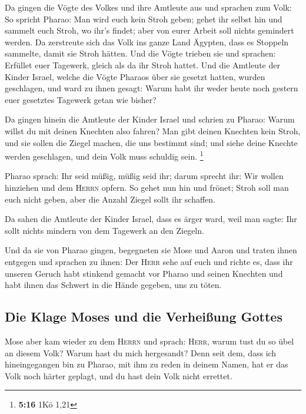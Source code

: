  Da gingen die Vögte des Volkes und ihre Amtleute aus und
sprachen zum Volk: So spricht Pharao: Man wird euch kein Stroh geben;
 gehet ihr selbst hin und sammelt euch Stroh, wo ihr's
findet; aber von eurer Arbeit soll nichts gemindert werden.
 Da zerstreute sich das Volk ins ganze Land Ägypten, dass
es Stoppeln sammelte, damit sie Stroh hätten.  Und die
Vögte trieben sie und sprachen: Erfüllet euer Tagewerk, gleich als da
ihr Stroh hattet.  Und die Amtleute der Kinder Israel,
welche die Vögte Pharaos über sie gesetzt hatten, wurden geschlagen, und
ward zu ihnen gesagt: Warum habt ihr weder heute noch gestern euer
gesetztes Tagewerk getan wie bisher?

 Da gingen hinein die Amtleute der Kinder Israel und
schrien zu Pharao: Warum willst du mit deinen Knechten also fahren?
 Man gibt deinen Knechten kein Stroh, und sie sollen die
Ziegel machen, die uns bestimmt sind; und siehe deine Knechte werden
geschlagen, und dein Volk muss schuldig sein. \footnote{\textbf{5:16}
  1Kö 1,21}

 Pharao sprach: Ihr seid müßig, müßig seid ihr; darum
sprecht ihr: Wir wollen hinziehen und dem \textsc{Herrn} opfern.
 So gehet nun hin und frönet; Stroh soll man euch nicht
geben, aber die Anzahl Ziegel sollt ihr schaffen.

 Da sahen die Amtleute der Kinder Israel, dass es ärger
ward, weil man sagte: Ihr sollt nichts mindern von dem Tagewerk an den
Ziegeln.

 Und da sie von Pharao gingen, begegneten sie Mose und
Aaron und traten ihnen entgegen  und sprachen zu ihnen:
Der \textsc{Herr} sehe auf euch und richte es, dass ihr unseren Geruch
habt stinkend gemacht vor Pharao und seinen Knechten und habt ihnen das
Schwert in die Hände gegeben, uns zu töten.

\hypertarget{die-klage-moses-und-die-verheiuxdfung-gottes}{%
\subsection{Die Klage Moses und die Verheißung
Gottes}\label{die-klage-moses-und-die-verheiuxdfung-gottes}}

 Mose aber kam wieder zu dem \textsc{Herrn} und sprach:
\textsc{Herr}, warum tust du so übel an diesem Volk? Warum hast du mich
hergesandt?  Denn seit dem, dass ich hineingegangen bin
zu Pharao, mit ihm zu reden in deinem Namen, hat er das Volk noch härter
geplagt, und du hast dein Volk nicht errettet.


